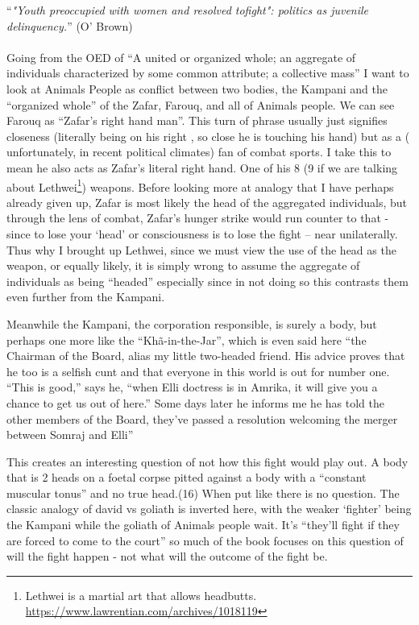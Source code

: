 
``\textit{"Youth preoccupied with women and resolved tofight": politics as juvenile delinquency.}'' (O' Brown)
\paragraph{}

Going from the OED of ``A united or organized whole; an aggregate of individuals characterized
by some common attribute; a collective mass'' I want to look at Animals People as conflict between two bodies, the Kampani and the ``organized whole'' of the Zafar, Farouq, and all of Animals people. 
We can see Farouq as ``Zafar’s right hand man''. This turn of phrase usually just signifies closeness (literally being on his right , so close he is touching his hand) but as a ( unfortunately, in recent political climates) fan of combat sports. I take this to mean he also acts as Zafar's literal right hand. One of his 8 (9 if we are talking about Lethwei\footnote{Lethwei is a martial art that allows headbutts. \url{https://www.lawrentian.com/archives/1018119}})  weapons. Before looking more at analogy that I have perhaps already given up, Zafar is most likely the head of the aggregated individuals, but through the lens of combat, Zafar's hunger strike would run counter to that - since to lose your `head' or consciousness  is to lose the fight -- near unilaterally. Thus why I brought up Lethwei, since we must view the use of the head as the weapon, or equally likely, it is simply wrong to assume the aggregate of individuals as being ``headed'' especially since in not doing so this contrasts them even further from the Kampani.

Meanwhile the Kampani, the corporation responsible, is surely a body, but perhaps one more like the ``Khã-in-the-Jar'', which is even said here ``the Chairman of the Board, alias my little two-headed friend. His advice proves that he too is a selfish cunt and that everyone in this world is out for number one. “This is good,” says he, “when Elli doctress is in Amrika, it will give you a chance to get us out of here.” Some days later he informs me he has told the other members of the Board, they’ve passed a resolution welcoming the merger between Somraj and Elli'' 

This creates an interesting question of not how this fight would play out. A body that is 2 heads on a foetal corpse pitted against a body with a ``constant muscular tonus'' and no true head.(16) When put like there is no question. The classic analogy of david vs goliath is inverted here, with the weaker `fighter' being the Kampani while the goliath of Animals people wait. It's ``they’ll fight if they are forced to come to the court'' so much of the book focuses on this question of will the fight happen - not what will the outcome of the fight be. 
